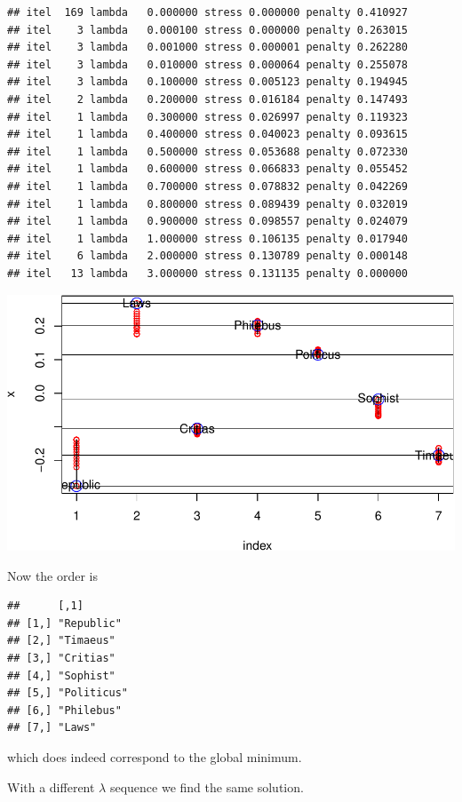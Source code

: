 \documentclass[
  12pt,
]{article}
\begin{document}
\begin{verbatim}
## itel  169 lambda   0.000000 stress 0.000000 penalty 0.410927 
## itel    3 lambda   0.000100 stress 0.000000 penalty 0.263015 
## itel    3 lambda   0.001000 stress 0.000001 penalty 0.262280 
## itel    3 lambda   0.010000 stress 0.000064 penalty 0.255078 
## itel    3 lambda   0.100000 stress 0.005123 penalty 0.194945 
## itel    2 lambda   0.200000 stress 0.016184 penalty 0.147493 
## itel    1 lambda   0.300000 stress 0.026997 penalty 0.119323 
## itel    1 lambda   0.400000 stress 0.040023 penalty 0.093615 
## itel    1 lambda   0.500000 stress 0.053688 penalty 0.072330 
## itel    1 lambda   0.600000 stress 0.066833 penalty 0.055452 
## itel    1 lambda   0.700000 stress 0.078832 penalty 0.042269 
## itel    1 lambda   0.800000 stress 0.089439 penalty 0.032019 
## itel    1 lambda   0.900000 stress 0.098557 penalty 0.024079 
## itel    1 lambda   1.000000 stress 0.106135 penalty 0.017940 
## itel    6 lambda   2.000000 stress 0.130789 penalty 0.000148 
## itel   13 lambda   3.000000 stress 0.131135 penalty 0.000000
\end{verbatim}

\begin{center}\includegraphics{penalty_files/figure-latex/plato2-1} \end{center}

Now the order is

\begin{verbatim}
##      [,1]       
## [1,] "Republic" 
## [2,] "Timaeus"  
## [3,] "Critias"  
## [4,] "Sophist"  
## [5,] "Politicus"
## [6,] "Philebus" 
## [7,] "Laws"
\end{verbatim}

which does indeed correspond to the global minimum.

With a different \(\lambda\) sequence we find the same solution.
\end{document}
